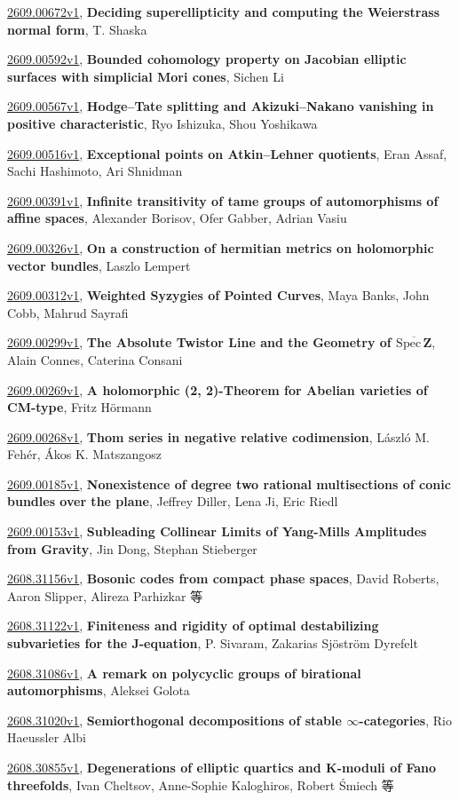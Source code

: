 \documentclass[9pt, a4paper]{article}
\theoremstyle{plain}
\theoremstyle{definition}
\theoremstyle{remark}
\newcommand{\arxiv}[3]{\href{https://arxiv.org/abs/#1}{#1}, \textbf{\textcolor{arxivblue}{#2}}, #3}
\begin{document}
\arxiv{2609.00672v1}{Deciding superellipticity and computing the Weierstrass normal form}{T. Shaska}

\arxiv{2609.00592v1}{Bounded cohomology property on Jacobian elliptic surfaces with simplicial Mori cones}{Sichen Li}

\arxiv{2609.00567v1}{Hodge--Tate splitting and Akizuki--Nakano vanishing in positive characteristic}{Ryo Ishizuka, Shou Yoshikawa}

\arxiv{2609.00516v1}{Exceptional points on Atkin--Lehner quotients}{Eran Assaf, Sachi Hashimoto, Ari Shnidman}

\arxiv{2609.00391v1}{Infinite transitivity of tame groups of automorphisms of affine spaces}{Alexander Borisov, Ofer Gabber, Adrian Vasiu}

\arxiv{2609.00326v1}{On a construction of hermitian metrics on holomorphic vector bundles}{Laszlo Lempert}

\arxiv{2609.00312v1}{Weighted Syzygies of Pointed Curves}{Maya Banks, John Cobb, Mahrud Sayrafi}

\arxiv{2609.00299v1}{The Absolute Twistor Line and the Geometry of $\overline{\text{Spec}\, \mathbf Z}$}{Alain Connes, Caterina Consani}

\arxiv{2609.00269v1}{A holomorphic (2, 2)-Theorem for Abelian varieties of CM-type}{Fritz Hörmann}

\arxiv{2609.00268v1}{Thom series in negative relative codimension}{László M. Fehér, Ákos K. Matszangosz}

\arxiv{2609.00185v1}{Nonexistence of degree two rational multisections of conic bundles over the plane}{Jeffrey Diller, Lena Ji, Eric Riedl}

\arxiv{2609.00153v1}{Subleading Collinear Limits of Yang-Mills Amplitudes from Gravity}{Jin Dong, Stephan Stieberger}

\arxiv{2608.31156v1}{Bosonic codes from compact phase spaces}{David Roberts, Aaron Slipper, Alireza Parhizkar 等}

\arxiv{2608.31122v1}{Finiteness and rigidity of optimal destabilizing subvarieties for the J-equation}{P. Sivaram, Zakarias Sjöström Dyrefelt}

\arxiv{2608.31086v1}{A remark on polycyclic groups of birational automorphisms}{Aleksei Golota}

\arxiv{2608.31020v1}{Semiorthogonal decompositions of stable $\infty$-categories}{Rio Haeussler Albi}

\arxiv{2608.30855v1}{Degenerations of elliptic quartics and K-moduli of Fano threefolds}{Ivan Cheltsov, Anne-Sophie Kaloghiros, Robert Śmiech 等}
\end{document}
